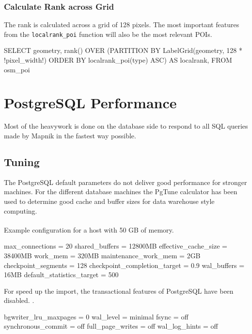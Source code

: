 \subsubsection{Calculate Rank across Grid}

The rank is calculated across a grid of 128 pixels. The most
important features from the \texttt{localrank\_poi} function will
also be the most relevant POIs.

\begin{sqlcode}
SELECT
  geometry,
  rank() OVER (PARTITION BY LabelGrid(geometry, 128 * !pixel_width!)
               ORDER BY localrank_poi(type) ASC) AS localrank,
FROM osm_poi
\end{sqlcode}
\newpage

\section{PostgreSQL Performance}
\label{postgres-performance}

Most of the heavywork is done on the database side to respond to all SQL queries made by Mapnik in the fastest way possible.

\subsection{Tuning}

The PostgreSQL default parameters do not deliver good performance for stronger machines.\cite{84_wiki.postgresql.org_2015}
For the different database machines the PgTune\cite{85_pgtune.leopard.in.ua_2015} calculator has been used to determine good cache and buffer sizes for data warehouse style computing.
\\\\
Example configuration for a host with 50 GB of memory.

\begin{bashcode}
max_connections = 20
shared_buffers = 12800MB
effective_cache_size = 38400MB
work_mem = 320MB
maintenance_work_mem = 2GB
checkpoint_segments = 128
checkpoint_completion_target = 0.9
wal_buffers = 16MB
default_statistics_target = 500
\end{bashcode}

For speed up the import, the transactional features of PostgreSQL have been disabled. \cite{86_berkus_berkus_profile_2015}.

\begin{bashcode}
bgwriter_lru_maxpages = 0
wal_level = minimal
fsync = off
synchronous_commit = off
full_page_writes = off
wal_log_hints = off
\end{bashcode}

